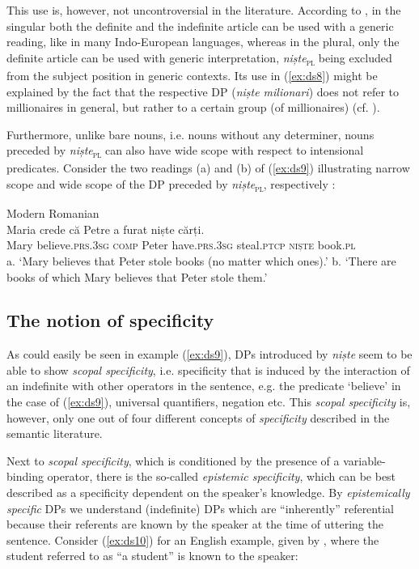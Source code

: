 \documentclass[output=paper,colorlinks,citecolor=brown]{langscibook}
\begin{document}
This use is, however, not uncontroversial in the literature. According to \citet[82]{Avram1986}, in the singular both the definite and the indefinite article can be used with a generic reading, like in many Indo-European languages, whereas in the plural, only the definite article can be used with generic interpretation, \textit{niște}\textsc{\textsubscript{\textsc{pl}}} being excluded from the subject position in generic contexts. Its use in (\ref{ex:ds8}) might be explained by the fact that the respective DP (\textit{niște milionari}) does not refer to millionaires in general, but rather to a certain group (of millionaires) (cf. \citealt[207]{Nedelcu2009}). 

Furthermore, unlike bare nouns, i.e. nouns without any determiner, nouns preceded by \textit{niște}\textsc{\textsubscript{\textsc{pl}}} can also have wide scope with respect to intensional predicates. Consider the two readings (a) and (b) of (\ref{ex:ds9}) illustrating narrow scope and wide scope of the DP preceded by \textit{niște}\textsc{\textsubscript{\textsc{pl}}}, respectively \citep[example taken from][63]{Dobrovie-SorinGiurgea2013}:

\ea\label{ex:ds9} Modern Romanian\\
\gll Maria crede     c\u{a}  Petre a     furat niște c\u{a}rți.\\
     Mary believe.\textsc{prs.3sg} \textsc{comp} Peter have.\textsc{prs.3sg} steal.\textsc{ptcp} \textsc{niște} book.\textsc{pl}\\
\glt a. ‘Mary believes that Peter stole books (no matter    which ones).’
\glt b. ‘There are books of which Mary believes that  Peter stole them.’
\z

\subsection{The notion of specificity}\label{sec:ds2.3}

As could easily be seen in example (\ref{ex:ds9}), DPs introduced by \textit{niște} seem to be able to show \textit{scopal specificity}, i.e. specificity that is induced by the interaction of an indefinite with other operators in the sentence, e.g. the predicate ‘believe’ in the case of (\ref{ex:ds9}), universal quantifiers, negation etc. This \textit{scopal specificity} is, however, only one out of four different concepts of \textit{specificity} described in the semantic literature.

Next to \textit{scopal specificity}, which is conditioned by the presence of a variable-binding operator, there is the so-called \textit{epistemic specificity}, which can be best described as a specificity dependent on the speaker’s knowledge. By \textit{epistemically specific} DPs we understand (indefinite) DPs which are “inherently” referential because their referents are known by the speaker at the time of uttering the sentence. Consider (\ref{ex:ds10}) for an English example, given by \citet[260]{Heusinger2002}, where the student referred to as “a student” is known to the speaker:
\end{document}
